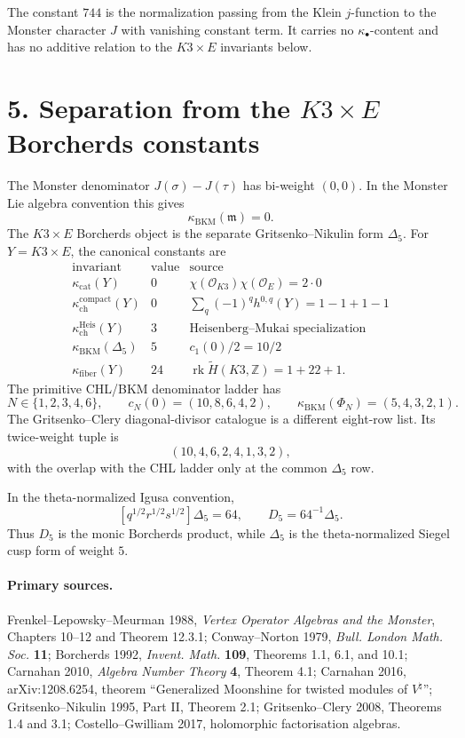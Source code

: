 \documentclass[11pt]{article}
\providecommand{\Z}{\mathbb{Z}}
\providecommand{\mMon}{\mathfrak{m}}
\providecommand{\kch}{\kappa_{\mathrm{ch}}}
\providecommand{\kcat}{\kappa_{\mathrm{cat}}}
\providecommand{\kBKM}{\kappa_{\mathrm{BKM}}}
\providecommand{\kfib}{\kappa_{\mathrm{fiber}}}
\theoremstyle{plain}
\theoremstyle{definition}
\begin{document}
The constant \(744\) is the normalization passing from the Klein
\(j\)-function to the Monster character \(J\) with vanishing constant
term. It carries no \(\kappa_\bullet\)-content and has no additive
relation to the \(K3\times E\) invariants below.

\section*{5. Separation from the \(K3\times E\) Borcherds constants}

The Monster denominator \(J(\sigma)-J(\tau)\) has bi-weight \((0,0)\).
In the Monster Lie algebra convention this gives
\[
  \kBKM(\mMon)=0.
\]
The \(K3\times E\) Borcherds object is the separate
Gritsenko--Nikulin form \(\Delta_5\). For \(Y=K3\times E\), the
canonical constants are
\[
\begin{array}{c|c|l}
\text{invariant} & \text{value} & \text{source} \\
\hline
\kcat(Y) & 0 &
\chi(\mathcal O_{K3})\chi(\mathcal O_E)=2\cdot0 \\
\kch^{\mathrm{compact}}(Y) & 0 &
\sum_q(-1)^q h^{0,q}(Y)=1-1+1-1 \\
\kch^{\mathrm{Heis}}(Y) & 3 &
\text{Heisenberg--Mukai specialization} \\
\kBKM(\Delta_5) & 5 &
c_1(0)/2=10/2 \\
\kfib(Y) & 24 &
\operatorname{rk}\widetilde H(K3,\Z)=1+22+1 .
\end{array}
\]
The primitive CHL/BKM denominator ladder has
\[
  N\in\{1,2,3,4,6\},\qquad
  c_N(0)=(10,8,6,4,2),\qquad
  \kBKM(\Phi_N)=(5,4,3,2,1).
\]
The Gritsenko--Clery diagonal-divisor catalogue is a different
eight-row list. Its twice-weight tuple is
\[
  (10,4,6,2,4,1,3,2),
\]
with the overlap with the CHL ladder only at the common
\(\Delta_5\) row.

In the theta-normalized Igusa convention,
\[
  [q^{1/2}r^{1/2}s^{1/2}]\Delta_5=64,
  \qquad
  D_5=64^{-1}\Delta_5.
\]
Thus \(D_5\) is the monic Borcherds product, while \(\Delta_5\) is the
theta-normalized Siegel cusp form of weight \(5\).

\paragraph{Primary sources.}
Frenkel--Lepowsky--Meurman 1988, \emph{Vertex Operator Algebras and the
Monster}, Chapters 10--12 and Theorem 12.3.1; Conway--Norton 1979,
\emph{Bull. London Math. Soc.} \textbf{11}; Borcherds 1992,
\emph{Invent. Math.} \textbf{109}, Theorems 1.1, 6.1, and 10.1;
Carnahan 2010, \emph{Algebra Number Theory} \textbf{4}, Theorem 4.1;
Carnahan 2016, arXiv:1208.6254, theorem ``Generalized Moonshine for
twisted modules of \(V^\natural\)''; Gritsenko--Nikulin 1995, Part II,
Theorem 2.1; Gritsenko--Clery 2008, Theorems 1.4 and 3.1;
Costello--Gwilliam 2017, holomorphic factorisation algebras.
\end{document}
